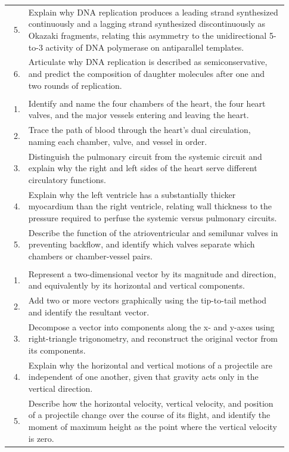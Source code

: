 {\begin{longtable}{@{} r p{0.93\linewidth} @{}}
    5. & Explain why DNA replication produces a leading strand synthesized continuously and a lagging strand synthesized discontinuously as Okazaki fragments, relating this asymmetry to the unidirectional 5\textquotesingle{}-to-3\textquotesingle{} activity of DNA polymerase on antiparallel templates. \\
    6. & Articulate why DNA replication is described as semiconservative, and predict the composition of daughter molecules after one and two rounds of replication. \\
    \addlinespace[6pt]
    \multicolumn{2}{@{}l}{\textbf{Heart Anatomy and Blood Flow}} \\
    1. & Identify and name the four chambers of the heart, the four heart valves, and the major vessels entering and leaving the heart. \\
    2. & Trace the path of blood through the heart's dual circulation, naming each chamber, valve, and vessel in order. \\
    3. & Distinguish the pulmonary circuit from the systemic circuit and explain why the right and left sides of the heart serve different circulatory functions. \\
    4. & Explain why the left ventricle has a substantially thicker myocardium than the right ventricle, relating wall thickness to the pressure required to perfuse the systemic versus pulmonary circuits. \\
    5. & Describe the function of the atrioventricular and semilunar valves in preventing backflow, and identify which valves separate which chambers or chamber-vessel pairs. \\
    \addlinespace[6pt]
    \multicolumn{2}{@{}l}{\textbf{Vectors and Projectile Motion}} \\
    1. & Represent a two-dimensional vector by its magnitude and direction, and equivalently by its horizontal and vertical components. \\
    2. & Add two or more vectors graphically using the tip-to-tail method and identify the resultant vector. \\
    3. & Decompose a vector into components along the x- and y-axes using right-triangle trigonometry, and reconstruct the original vector from its components. \\
    4. & Explain why the horizontal and vertical motions of a projectile are independent of one another, given that gravity acts only in the vertical direction. \\
    5. & Describe how the horizontal velocity, vertical velocity, and position of a projectile change over the course of its flight, and identify the moment of maximum height as the point where the vertical velocity is zero. \\

\end{longtable}}
